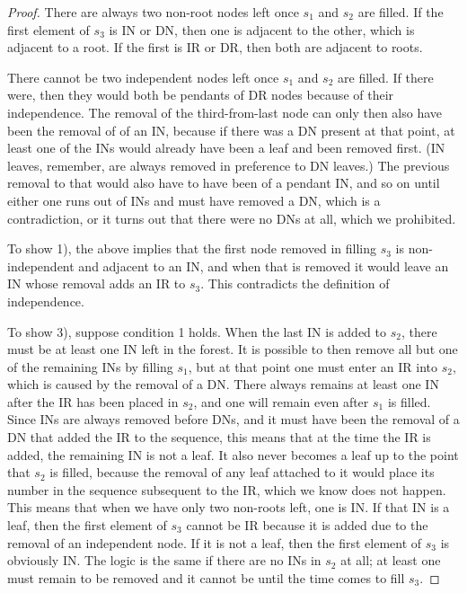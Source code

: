 \documentclass{article}
\begin{document}
\begin{proof}
There are always two non-root nodes left once $s_1$ and $s_2$ are filled. If the first element of $s_3$ is IN or DN, then one is adjacent to the other, which is adjacent to a root. If the first is IR or DR, then both are adjacent to roots.

There cannot be two independent nodes left once $s_1$ and $s_2$ are filled. If there were, then they would both be pendants of DR nodes because of their independence. The removal of the third-from-last node can only then also have been the removal of of an IN, because if there was a DN present at that point, at least one of the INs would already have been a leaf and been removed  first. (IN leaves, remember, are always removed in preference to DN leaves.) The previous removal to that would also have to have been of a pendant IN, and so on until either one runs out of INs and must have removed a DN, which is a contradiction, or it turns out that there were no DNs at all, which we prohibited.

    To show 1), the above implies that the first node removed in filling $s_3$ is non-independent and adjacent to an IN, and when that is removed it would leave an IN whose removal adds an IR to $s_3$. This contradicts the definition of independence.
    
    To show 3), suppose condition 1 holds.  When the last IN is added to $s_2$, there must be at least one IN left in the forest. It is possible to then remove all but one of the remaining INs by filling $s_1$, but at that point one must enter an IR into $s_2$, which is caused by the removal of a DN. There always remains at least one IN after the IR has been placed in $s_2$, and one will remain even after $s_1$ is filled. Since INs are always removed before DNs, and it must have been the removal of a DN that added the IR to the sequence, this means that at the time the IR is added, the remaining IN is not a leaf. It also never becomes a leaf up to the point that $s_2$ is filled, because the removal of any leaf attached to it would place its number in the sequence subsequent to the IR, which we know does not happen. This means that when we have only two non-roots left, one is IN. If that IN is a leaf, then the first element of $s_3$ cannot be IR because it is added due to the removal of an independent node. If it is not a leaf, then the first element of $s_3$ is obviously IN. The logic is the same if there are no INs in $s_2$ at all; at least one must remain to be removed and it cannot be until the time comes to fill $s_3$.
    

\end{proof}
\end{document}
